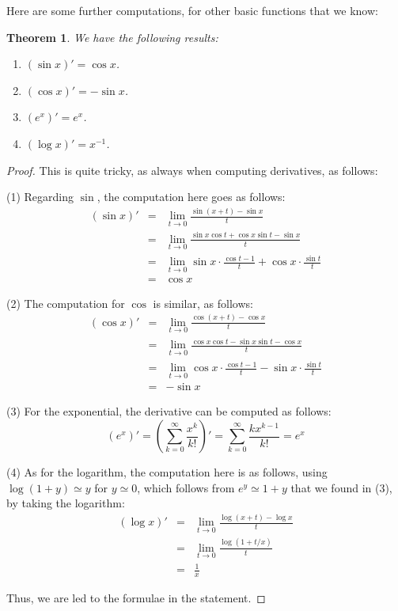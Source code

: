 \documentclass[12pt]{amsbook}
\newtheorem{theorem}{Theorem}[chapter]
\begin{document}
Here are some further computations, for other basic functions that we know:


\begin{theorem}
We have the following results:
\begin{enumerate}
\item $(\sin x)'=\cos x$.

\item $(\cos x)'=-\sin x$.

\item $(e^x)'=e^x$.

\item $(\log x)'=x^{-1}$.
\end{enumerate}
\end{theorem}

\begin{proof}
This is quite tricky, as always when computing derivatives, as follows:

\medskip

(1) Regarding $\sin$, the computation here goes as follows:
\begin{eqnarray*}
(\sin x)'
&=&\lim_{t\to0}\frac{\sin(x+t)-\sin x}{t}\\
&=&\lim_{t\to0}\frac{\sin x\cos t+\cos x\sin t-\sin x}{t}\\
&=&\lim_{t\to0}\sin x\cdot\frac{\cos t-1}{t}+\cos x\cdot\frac{\sin t}{t}\\
&=&\cos x
\end{eqnarray*}

(2) The computation for $\cos$ is similar, as follows:
\begin{eqnarray*}
(\cos x)'
&=&\lim_{t\to0}\frac{\cos(x+t)-\cos x}{t}\\
&=&\lim_{t\to0}\frac{\cos x\cos t-\sin x\sin t-\cos x}{t}\\
&=&\lim_{t\to0}\cos x\cdot\frac{\cos t-1}{t}-\sin x\cdot\frac{\sin t}{t}\\
&=&-\sin x
\end{eqnarray*}

(3) For the exponential, the derivative can be computed as follows:
$$(e^x)'
=\left(\sum_{k=0}^\infty\frac{x^k}{k!}\right)'
=\sum_{k=0}^\infty\frac{kx^{k-1}}{k!}
=e^x$$

(4) As for the logarithm, the computation here is as follows, using $\log(1+y)\simeq y$ for $y\simeq 0$, which follows from $e^y\simeq 1+y$ that we found in (3), by taking the logarithm:
\begin{eqnarray*}
(\log x)'
&=&\lim_{t\to0}\frac{\log(x+t)-\log x}{t}\\
&=&\lim_{t\to0}\frac{\log(1+t/x)}{t}\\
&=&\frac{1}{x}
\end{eqnarray*}

Thus, we are led to the formulae in the statement.
\end{proof}
\end{document}
